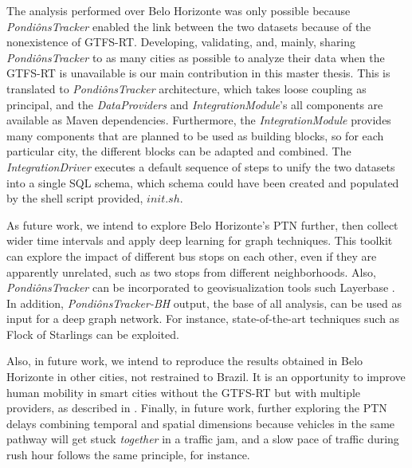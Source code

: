 The analysis performed over Belo Horizonte was only possible because \textit{PondiônsTracker} enabled
the link between the two datasets because of the nonexistence of GTFS-RT. 
Developing, validating, and, mainly, sharing \textit{PondiônsTracker}
to as many cities as possible to analyze their data when the GTFS-RT is unavailable is our main
contribution in this master thesis. This is translated to \textit{PondiônsTracker} architecture, which
takes loose coupling as principal, and the \textit{DataProviders} and \textit{IntegrationModule}'s all components are available as Maven dependencies. 
Furthermore, the \textit{IntegrationModule} provides many components that are planned to be used as 
building blocks, so for each particular city, the different blocks can be adapted and combined. 
The \textit{IntegrationDriver} executes a default sequence of steps to unify the two datasets into a 
single SQL schema, which schema could have been created and populated by the shell script provided, $init.sh$.

As future work, we intend to explore Belo Horizonte's PTN further, then collect wider time intervals
and apply deep learning for graph techniques. This toolkit can explore the impact of different bus stops on each other, even if
they are apparently unrelated, such as two stops from different neighborhoods.
Also, \textit{PondiônsTracker} can be incorporated to geovisualization tools such Layerbase \cite{layerbase}. 
In addition, \textit{PondiônsTracker-BH} output, the base of all analysis, can be used as input for a deep graph network. For instance, state-of-the-art 
techniques such as Flock of Starlings can be exploited. 

Also, in future work, we intend to reproduce the results obtained in Belo Horizonte in other cities, not
restrained to Brazil. It is an opportunity to improve human mobility in smart cities without the GTFS-RT but with multiple providers, as described in . Finally, in future work, further exploring the PTN delays combining temporal and spatial dimensions because vehicles in 
the same pathway will get stuck{ \em together} in a traffic jam, and a slow pace of traffic during rush hour follows the same principle, for instance.
